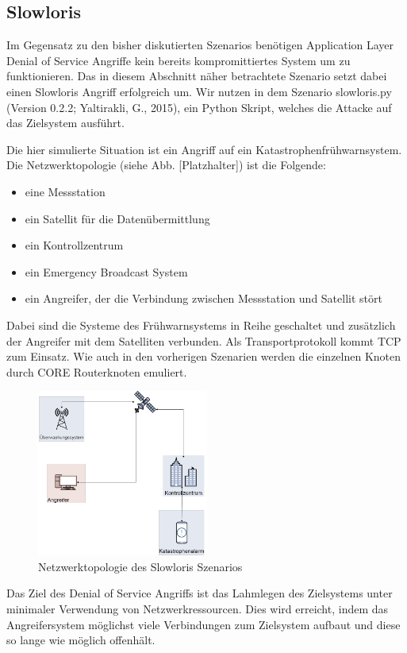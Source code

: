 \documentclass{article}
\begin{document}
\subsection{Slowloris}
Im Gegensatz zu den bisher diskutierten Szenarios benötigen Application Layer Denial of Service Angriffe kein bereits kompromittiertes System um zu funktionieren. Das in diesem Abschnitt näher betrachtete Szenario setzt dabei einen Slowloris Angriff erfolgreich um. Wir nutzen in dem Szenario slowloris.py (Version 0.2.2; Yaltirakli, G., 2015)\cite{gkbrkslowloris}, ein Python Skript, welches die Attacke auf das Zielsystem ausführt.\par
Die hier simulierte Situation ist ein Angriff auf ein Katastrophenfrühwarnsystem. Die Netzwerktopologie (siehe Abb. [Platzhalter]) ist die Folgende:
\begin{itemize}
\item eine Messstation
\item ein Satellit für die Datenübermittlung
\item ein Kontrollzentrum
\item ein Emergency Broadcast System
\item ein Angreifer, der die Verbindung zwischen Messstation und Satellit stört
\end{itemize}
Dabei sind die Systeme des Frühwarnsystems in Reihe geschaltet und zusätzlich der Angreifer mit dem Satelliten verbunden. Als Transportprotokoll kommt TCP zum Einsatz.
Wie auch in den vorherigen Szenarien werden die einzelnen Knoten durch CORE Routerknoten emuliert.\par
\begin{figure}[h]
\centering
\includegraphics[width=0.5\textwidth]{slowloris}
\caption{Netzwerktopologie des Slowloris Szenarios}
\end{figure}
Das Ziel des Denial of Service Angriffs ist das Lahmlegen des Zielsystems unter minimaler Verwendung von Netzwerkressourcen. Dies wird erreicht, indem das Angreifersystem möglichst viele Verbindungen zum Zielsystem aufbaut und diese so lange wie möglich offenhält.\par
\end{document}
